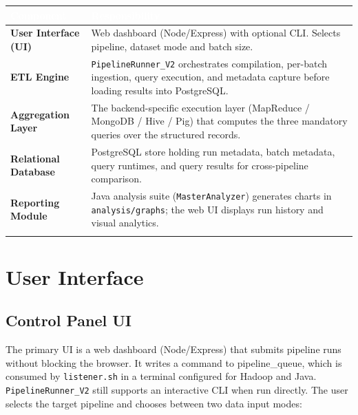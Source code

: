 \documentclass[11pt,a4paper]{article}
\begin{document}
\vspace{4pt}
\begin{center}
\renewcommand{\arraystretch}{1.45}
\begin{tabular}{@{} >{}p{3.6cm} p{10.3cm} @{}}
\arrayrulecolor{PrimaryBlue!30}\toprule
\rowcolor{PrimaryBlue} \textcolor{white}{\textbf{Component}} & \textcolor{white}{\textbf{Responsibility}} \\
\midrule
\rowcolor{RowAlt}\textbf{\color{PrimaryBlue}User Interface (UI)} &
  Web dashboard (Node/Express) with optional CLI. Selects pipeline, dataset mode and batch size. \\[2pt]
\textbf{\color{PrimaryBlue}ETL Engine} &
  \texttt{PipelineRunner\_V2} orchestrates compilation, per-batch ingestion, query execution, and metadata capture before loading results into PostgreSQL. \\[2pt]
\rowcolor{RowAlt}\textbf{\color{PrimaryBlue}Aggregation Layer} &
  The backend-specific execution layer (MapReduce / MongoDB / Hive / Pig) that computes the three mandatory queries over the structured records. \\[2pt]
\textbf{\color{PrimaryBlue}Relational Database} &
  PostgreSQL store holding run metadata, batch metadata, query runtimes, and query results for cross-pipeline comparison. \\[2pt]
\rowcolor{RowAlt}\textbf{\color{PrimaryBlue}Reporting Module} &
  Java analysis suite (\texttt{MasterAnalyzer}) generates charts in \texttt{analysis/graphs}; the web UI displays run history and visual analytics. \\
\arrayrulecolor{PrimaryBlue!30}\bottomrule
\end{tabular}
\end{center}

\section{User Interface}
\subsection{Control Panel UI}
The primary UI is a web dashboard (Node/Express) that submits pipeline runs without blocking the browser. It writes a command to pipeline\_queue, which is consumed by \texttt{listener.sh} in a terminal configured for Hadoop and Java. \texttt{PipelineRunner\_V2} still supports an interactive CLI when run directly. The user selects the target pipeline and chooses between two data input modes:
\end{document}
